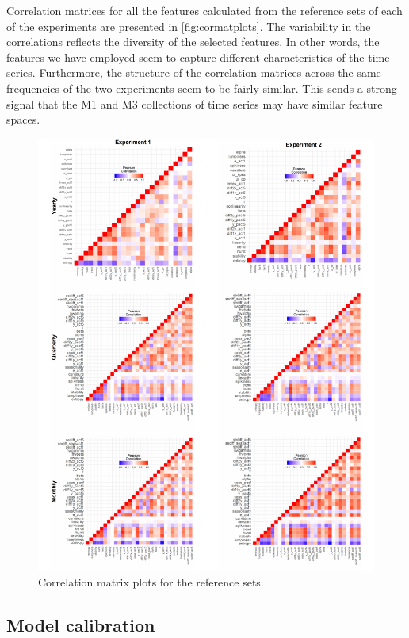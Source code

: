\documentclass[11pt,a4paper,]{article}
\begin{document}
Correlation matrices for all the features calculated from the reference
sets of each of the experiments are presented in
\autoref{fig:cormatplots}. The variability in the correlations reflects
the diversity of the selected features. In other words, the features we
have employed seem to capture different characteristics of the time
series. Furthermore, the structure of the correlation matrices across
the same frequencies of the two experiments seem to be fairly similar.
This sends a strong signal that the M1 and M3 collections of time series
may have similar feature spaces.

\begin{figure}

{\centering \includegraphics[width=\textwidth]{figure/cormatplots-1} 

}

\caption{ Correlation matrix plots for the reference sets.}\label{fig:cormatplots}
\end{figure}

\subsection{Model calibration}\label{model-calibration}
\end{document}
